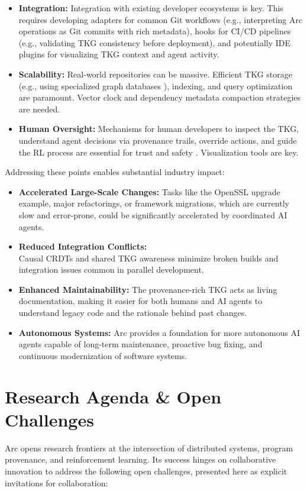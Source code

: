 \documentclass{article}
\begin{document}
\begin{itemize}
    \item \textbf{Integration:} Integration with existing developer ecosystems is key. This requires developing adapters for common Git workflows (e.g., interpreting Arc operations as Git commits with rich metadata), hooks for CI/CD pipelines (e.g., validating TKG consistency before deployment), and potentially IDE plugins for visualizing TKG context and agent activity.
    \item \textbf{Scalability:} Real-world repositories can be massive. Efficient TKG storage (e.g., using specialized graph databases \cite{ref43, ref44}), indexing, and query optimization are paramount. Vector clock and dependency metadata compaction strategies are needed.
    \item \textbf{Human Oversight:} Mechanisms for human developers to inspect the TKG, understand agent decisions via provenance trails, override actions, and guide the RL process are essential for trust and safety \cite{ref15, ref16, ref42}. Visualization tools are key.
\end{itemize}
Addressing these points enables substantial industry impact:
\begin{itemize}
    \item \textbf{Accelerated Large-Scale Changes:} Tasks like the OpenSSL upgrade example, major refactorings, or framework migrations, which are currently slow and error-prone, could be significantly accelerated by coordinated AI agents.
    \item \textbf{Reduced Integration Conflicts:} \\Causal CRDTs and shared TKG awareness minimize broken builds and integration issues common in parallel development.
    \item \textbf{Enhanced Maintainability:} The provenance-rich TKG acts as living documentation, making it easier for both humans and AI agents to understand legacy code and the rationale behind past changes.
    \item \textbf{Autonomous Systems:} Arc provides a foundation for more autonomous AI agents capable of long-term maintenance, proactive bug fixing, and continuous modernization of software systems.
\end{itemize}


\section{Research Agenda \& Open Challenges}
Arc opens research frontiers at the intersection of distributed systems, program provenance, and reinforcement learning. Its success hinges on collaborative innovation to address the following open challenges, presented here as explicit invitations for collaboration:
\end{document}
